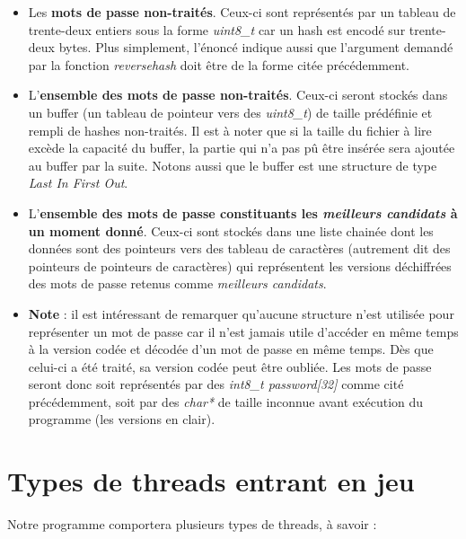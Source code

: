 \documentclass{article}
\begin{document}
	\begin{itemize}
		\item 
		Les \textbf{mots de passe non-traités}.
		Ceux-ci sont représentés par un tableau de trente-deux entiers sous la forme \textit{uint8\_t} car un hash est encodé sur trente-deux bytes.
		Plus simplement, l'énoncé indique aussi que l'argument demandé par la fonction \textit{reversehash} doit être de la forme citée précédemment.
		
		\item 
		L'\textbf{ensemble des mots de passe non-traités}. Ceux-ci seront stockés dans un buffer (un tableau de pointeur vers des \textit{uint8\_t}) de taille prédéfinie et rempli de hashes non-traités. Il est à noter que si la taille du fichier à lire excède la capacité du buffer, la partie qui n'a pas pû être insérée sera ajoutée au buffer par la suite. Notons aussi que le buffer est une structure de type \textit{Last In First Out}.
		
		\item %
		L'\textbf{ensemble des mots de passe constituants les \textit{meilleurs candidats} à un moment donné}. Ceux-ci sont stockés dans une liste chainée dont les données sont des pointeurs vers des tableau de caractères (autrement dit des pointeurs de pointeurs de caractères) qui représentent les versions déchiffrées des mots de passe retenus comme \textit{meilleurs candidats}.
		
		\item %
		\textbf{Note} : il est intéressant de remarquer qu'aucune structure n'est utilisée pour représenter un mot de passe car il n'est jamais utile d'accéder en même temps à la version codée et décodée d'un mot de passe en même temps. Dès que celui-ci a été traité, sa version codée peut être oubliée. Les mots de passe seront donc soit représentés par des \textit{int8\_t password[32]} comme cité précédemment, soit par des \textit{char*} de taille inconnue avant exécution du programme (les versions en clair).
		
	\end{itemize}
	
\section{Types de threads entrant en jeu}
	
	\noindent
	Notre programme comportera plusieurs types de threads, à savoir :
	
\end{document}
